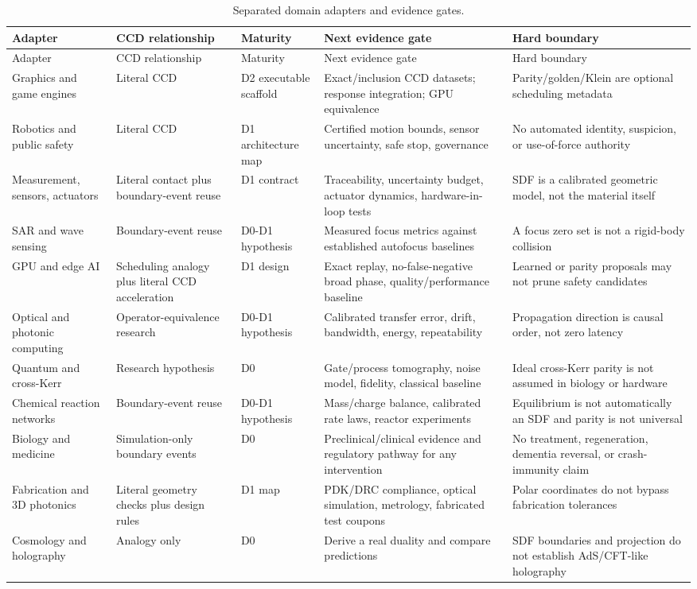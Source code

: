 \small\begin{longtable}{@{}L{0.16\textwidth}L{0.15\textwidth}L{0.11\textwidth}L{0.23\textwidth}L{0.245\textwidth}@{}}
\caption{Separated domain adapters and evidence gates.}\label{tab:adapters}\\
\toprule Adapter & CCD relationship & Maturity & Next evidence gate & Hard boundary \\ \midrule
\endfirsthead
\toprule Adapter & CCD relationship & Maturity & Next evidence gate & Hard boundary \\ \midrule
\endhead
Graphics and game engines & Literal CCD & D2 executable scaffold & Exact/inclusion CCD datasets; response integration; GPU equivalence & Parity/golden/Klein are optional scheduling metadata \\
Robotics and public safety & Literal CCD & D1 architecture map & Certified motion bounds, sensor uncertainty, safe stop, governance & No automated identity, suspicion, or use-of-force authority \\
Measurement, sensors, actuators & Literal contact plus boundary-event reuse & D1 contract & Traceability, uncertainty budget, actuator dynamics, hardware-in-loop tests & SDF is a calibrated geometric model, not the material itself \\
SAR and wave sensing & Boundary-event reuse & D0-D1 hypothesis & Measured focus metrics against established autofocus baselines & A focus zero set is not a rigid-body collision \\
GPU and edge AI & Scheduling analogy plus literal CCD acceleration & D1 design & Exact replay, no-false-negative broad phase, quality/performance baseline & Learned or parity proposals may not prune safety candidates \\
Optical and photonic computing & Operator-equivalence research & D0-D1 hypothesis & Calibrated transfer error, drift, bandwidth, energy, repeatability & Propagation direction is causal order, not zero latency \\
Quantum and cross-Kerr & Research hypothesis & D0 & Gate/process tomography, noise model, fidelity, classical baseline & Ideal cross-Kerr parity is not assumed in biology or hardware \\
Chemical reaction networks & Boundary-event reuse & D0-D1 hypothesis & Mass/charge balance, calibrated rate laws, reactor experiments & Equilibrium is not automatically an SDF and parity is not universal \\
Biology and medicine & Simulation-only boundary events & D0 & Preclinical/clinical evidence and regulatory pathway for any intervention & No treatment, regeneration, dementia reversal, or crash-immunity claim \\
Fabrication and 3D photonics & Literal geometry checks plus design rules & D1 map & PDK/DRC compliance, optical simulation, metrology, fabricated test coupons & Polar coordinates do not bypass fabrication tolerances \\
Cosmology and holography & Analogy only & D0 & Derive a real duality and compare predictions & SDF boundaries and projection do not establish AdS/CFT-like holography \\
\bottomrule
\end{longtable}